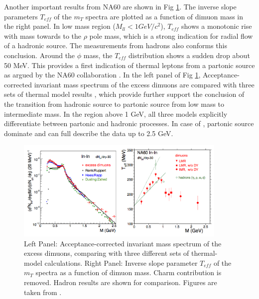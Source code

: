 Another important results from NA60 are shown in Fig \ref{fig:NA60_Teff}.
The inverse slope parameters $T_{eff}$ of the $m_{T}$ spectra are
plotted as a function of dimuon mass in the right panel. In low mass
region ($M_{ll}<1GeV/c^{2}$), $T_{eff}$ shows a monotonic rise with
mass towards to the $\rho$ pole mass, which is a strong indication
for radial flow of a hadronic source. The measurements from hadrons
also conforms this conclusion. Around the $\phi$ mass, the $T_{eff}$
distribution shows a sudden drop about 50 MeV. This provides a first
indication of thermal leptons from a partonic source as argued by
the NA60 collaboration \cite{PhysRevLett.100.022302}. In the left
panel of Fig \ref{fig:NA60_Teff}, Acceptance-corrected invariant
mass spectrum of the excess dimuons are compared with three sets of
thermal model results \cite{PhysRevLett.100.162301,vanHees2008339,PhysRevC.80.014902},
which provide further support the conclusion of the transition from
hadronic source to partonic source from low mass to intermediate mass.
In the region above 1 GeV, all three models explicitly differentiate
between partonic and hadronic processes. In case of \cite{PhysRevLett.100.162301,PhysRevC.80.014902},
partonic source dominate and can full describe the data up to 2.5
GeV.

\begin{figure}
\begin{centering}
\includegraphics[width=0.9\textwidth]{fig/1.Introduction/NA60_Teff}
\par\end{centering}

\protect\caption{Left Panel: Acceptance-corrected invariant mass spectrum of the excess
dimuons, comparing with three different sets of thermal-model calculations.
Right Panel: Inverse slope parameter $T_{eff}$ of the $m_{T}$ spectra
as a function of dimuon mass. Charm contribution is removed. Hadron
results are shown for comparison. Figures are taken from \cite{NA60-Collaboration:fj}.}


\label{fig:NA60_Teff}
\end{figure}



